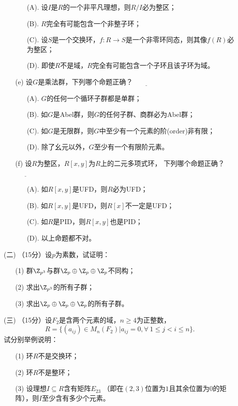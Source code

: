 \begin{itemize}
\begin{itemize}
        \begin{itemize}
            \item[(A).]设$I$是$R$的一个非平凡理想，则$R/I$必为整区；
            \item[(B).]$R$完全有可能包含一个非整子环；
            \item[(C).]设$S$是一个交换环，$f:R\to S$是一个非零环同态，则其像$f(R)$必为整区；
            \item[(D).]即使$R$不是域，$R$完全有可能包含一个子环且该子环为域。
        \end{itemize}
        \item[(e)]设$G$是乘法群，下列哪个命题$\textbf{正确}$？\  $\underline{\qquad\quad}$
        \begin{itemize}
            \item[(A).]$G$的任何一个循环子群都是单群；
            \item[(B).]如$G$是Abel群，则$G$的任何子群、商群必为Abel群；
            \item[(C).]如$G$是无限群，则$G$中至少有一个元素的阶(order)非有限；
            \item[(D).]除了幺元以外，$G$至少有一个有限阶元素。
        \end{itemize}
        \item[(f)]设$R$为整区，$R[x,y]$为$R$上的二元多项式环，
        下列哪个命题$\textbf{正确}$？ \ $\underline{\qquad\quad}$
        \begin{itemize}
            \item[(A).]如$R[x,y]$是UFD，则$R$必为UFD；
            \item[(B).]如$R[x,y]$是UFD，则$R[x]$不一定是UFD；
            \item[(C).]如$R$是PID，则$R[x,y]$也是PID；
            \item[(D).]以上命题都不对。
        \end{itemize}
    \end{itemize}
    \item[(二)]（15分）设$p$为素数，试证明：
    \begin{itemize}
            \item[(1)]群$\Z_{p^3}$与群$\Z_p\oplus\Z_p\oplus\Z_p$不同构；
            \item[(2)]求出$\Z_{p^3}$的所有子群；
            \item[(3)]求出$\Z_p\oplus\Z_p\oplus\Z_p$的所有子群。
    \end{itemize}

    \item[(三)]（15分）设$F_2$是含两个元素的域，$n\ge4$为正整数，
    $$R=\{(a_{ij})\in M_n(F_2)|a_{ij}=0,\forall\ 1\le j<i\le n\}.$$
    试分别举例说明：
    \begin{itemize}
            \item[(1)]环$R$不是交换环；
            \item[(2)]环$R$不是整环；
            \item[(3)]设理想$I\subseteq R$含有矩阵$E_{23}$
            （即在$(2,3)$位置为$1$且其余位置为$0$的矩阵），则$I$至少含有多少个元素。
    \end{itemize}


\end{itemize}
